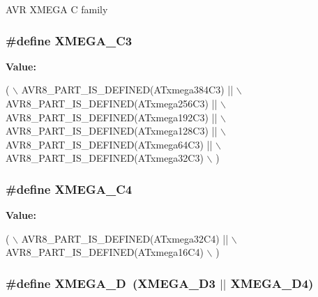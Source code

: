 A\-V\-R X\-M\-E\-G\-A C family \hypertarget{group__xmega__part__macros__group_ga10c26d10c3df7d9874e4527d1327c60b}{
\subsubsection[{X\-M\-E\-G\-A\-\_\-\-C3}]{\setlength{\rightskip}{0pt plus 5cm}\#define X\-M\-E\-G\-A\-\_\-\-C3}}\label{group__xmega__part__macros__group_ga10c26d10c3df7d9874e4527d1327c60b}
{\bfseries Value\-:}
\begin{DoxyCode}
( \(\backslash\)
                AVR8\_PART\_IS\_DEFINED(ATxmega384C3)  || \(\backslash\)
                AVR8\_PART\_IS\_DEFINED(ATxmega256C3)  || \(\backslash\)
                AVR8\_PART\_IS\_DEFINED(ATxmega192C3)  || \(\backslash\)
                AVR8\_PART\_IS\_DEFINED(ATxmega128C3)  || \(\backslash\)
                AVR8\_PART\_IS\_DEFINED(ATxmega64C3)   || \(\backslash\)
                AVR8\_PART\_IS\_DEFINED(ATxmega32C3) \(\backslash\)
                )
\end{DoxyCode}
\hypertarget{group__xmega__part__macros__group_ga8add217f9d3d28fda40ec91e65a5d970}{
\subsubsection[{X\-M\-E\-G\-A\-\_\-\-C4}]{\setlength{\rightskip}{0pt plus 5cm}\#define X\-M\-E\-G\-A\-\_\-\-C4}}\label{group__xmega__part__macros__group_ga8add217f9d3d28fda40ec91e65a5d970}
{\bfseries Value\-:}
\begin{DoxyCode}
( \(\backslash\)
                AVR8\_PART\_IS\_DEFINED(ATxmega32C4)  || \(\backslash\)
                AVR8\_PART\_IS\_DEFINED(ATxmega16C4) \(\backslash\)
                )
\end{DoxyCode}
\hypertarget{group__xmega__part__macros__group_gacc9e4b074c3f87ce7b461483b0beb15c}{
\subsubsection[{X\-M\-E\-G\-A\-\_\-\-D}]{\setlength{\rightskip}{0pt plus 5cm}\#define X\-M\-E\-G\-A\-\_\-\-D~(X\-M\-E\-G\-A\-\_\-\-D3 $|$$|$ X\-M\-E\-G\-A\-\_\-\-D4)}}\label{group__xmega__part__macros__group_gacc9e4b074c3f87ce7b461483b0beb15c}
